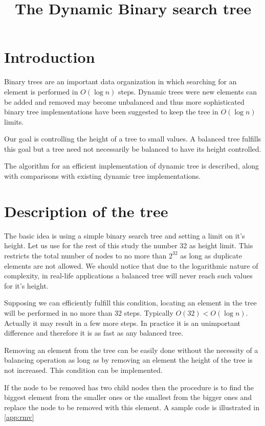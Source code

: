 \documentclass[twocolumn]{article}
\title{The Dynamic Binary search tree}
\author{}
\begin{document}
\maketitle

\section{Introduction}

Binary trees are an important data organization in which searching for
an element is performed in $O(\log{n})$ steps. Dynamic trees were new
elements can be added and removed may become unbalanced and thus more
sophisticated binary tree implementations have been suggested to keep
the tree in $O(\log{n})$ limits.

Our goal is controlling the height of a tree to small values. A balanced
tree fulfills this goal but a tree need not necessarily be balanced to have
its height controlled.

The algorithm for an efficient implementation of dynamic tree is described,
along with comparisons with existing dynamic tree implementations.

\section{Description of the tree}

The basic idea is using a simple binary search tree and setting a limit on
it's height. Let us use for the rest of this study the number 32 as height
limit. This restricts the total number of nodes to no more than $2^{32}$ as
long as duplicate elements are not allowed.
We should notice that due to the logarithmic nature of complexity,
in real-life applications a balanced tree will never reach such values for
it's height.

Supposing we can efficiently fulfill this condition, locating an element in
the tree will be performed in no more than 32 steps. Typically
$O(32)<O(\log{n})$. Actually it may result in a few more steps.
In practice it is an unimportant
difference and therefore it is as fast as any balanced tree.

Removing an element from the tree can be easily done without the necessity
of a balancing operation as long as by removing an element the
height of the tree is not increased. This condition can be implemented.

If the node to be removed has two child nodes then the procedure is to find
the biggest element from the smaller ones or the smallest from the bigger
ones and replace the node to be removed with this element. A sample code is
illustrated in \ref{app:rmv}
\end{document}
